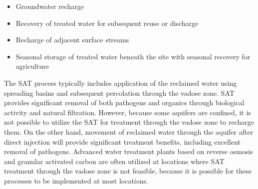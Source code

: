 \documentclass{article}
\begin{document}
\begin{itemize}
\item Groundwater recharge
\item Recovery of treated water for subsequent reuse or discharge
\item Recharge of adjacent surface streams
\item Seasonal storage of treated water beneath the site with seasonal recovery for agriculture
\end{itemize}
The SAT process typically includes application of the reclaimed water using spreading basins and subsequent percolation through the vadose zone. SAT provides significant removal of both pathogens and organics through biological activity and natural filtration. However, because some aquifers are confined, it is not possible to utilize the SAT for treatment through the vadose zone to recharge them. On the other hand, movement of reclaimed water through the aquifer after direct injection will provide significant treatment benefits, including excellent removal of pathogens. Advanced water treatment plants based on reverse osmosis and granular activated carbon are often utilized at locations where SAT treatment through the vadose zone is not feasible, because it is possible for these processes to be implemented at most locations.\\
\end{document}
